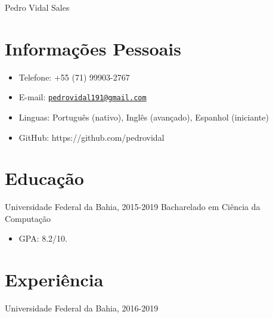 \documentclass[letterpaper]{article}
\def\name{Pedro Vidal Sales}
\begin{document}
{\huge \name}


\vspace{0.25in}

    

\section*{Informações Pessoais}
    \begin{itemize}
        \item Telefone: +55 (71) 99903-2767
        \item E-mail: \href{mailto:pedrovidal191@gmail.com}{\tt pedrovidal191@gmail.com}
        \item Linguas: Português (nativo), Inglês (avançado), Espanhol (iniciante)
        \item GitHub: https://github.com/pedrovidal
    \end{itemize}

\section*{Educação}

  Universidade Federal da Bahia, 2015-2019
  Bacharelado em Ciência da Computação

  \begin{itemize}
    \item GPA: 8.2/10.
  \end{itemize}

\section*{Experiência}
  Universidade Federal da Bahia, 2016-2019
  
\end{document}
